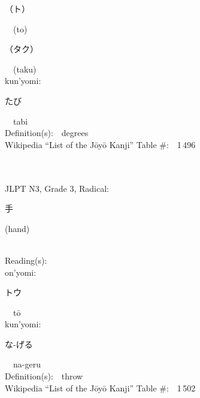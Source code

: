 \begin{multicols}{2}
{\hspace*{2em}}{\begin{CJK}{UTF8}{min} （ト） \end{CJK}}\ \ (to)\ \ \\
{\hspace*{2em}}{\begin{CJK}{UTF8}{min} （タク） \end{CJK}}\ \ (taku)\ \ \\
{\hspace*{1em}}kun'yomi:\ \ \\
{\hspace*{2em}}{\begin{CJK}{UTF8}{min} たび \end{CJK}}\ \ tabi\ \ \\
Definition(s):\ \ degrees \\
Wikipedia ``List of the J\=oy\=o Kanji'' Table \#:\ \ 1\,496 \\
\ \ \\
{\fontsize{34pt}{40pt}  }\ \ \\  %
{JLPT N3, Grade 3, Radical:\ \ {\begin{CJK}{UTF8}{min} 手 \end{CJK}} (hand) } \\
Reading(s):\ \ \\
{\hspace*{1em}}on'yomi:\ \ \\
{\hspace*{2em}}{\begin{CJK}{UTF8}{min} トウ \end{CJK}}\ \ t\=o\ \ \\
{\hspace*{1em}}kun'yomi:\ \ \\
{\hspace*{2em}}{\begin{CJK}{UTF8}{min} な-げる \end{CJK}}\ \ na-geru\ \ \\
Definition(s):\ \ throw \\
Wikipedia ``List of the J\=oy\=o Kanji'' Table \#:\ \ 1\,502 \\
\ \ \\
{\fontsize{34pt}{40pt}  }\ \ \\  %

\end{multicols}
